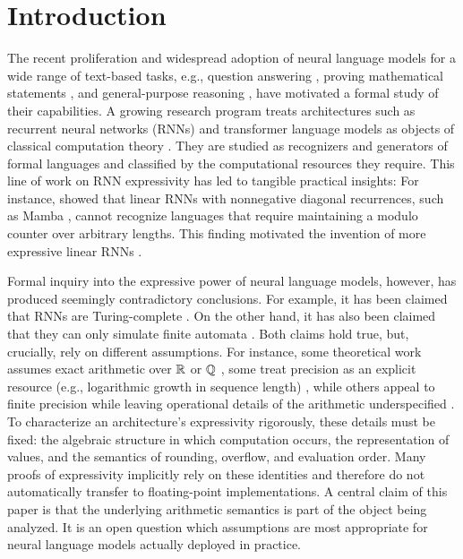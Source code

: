 \documentclass{article}
\begin{document}
\section{Introduction}
The recent proliferation and widespread adoption of neural language models for a wide range of text-based tasks, e.g., question answering \citep{chen2021evaluatinglargelanguagemodels}, proving mathematical statements \citep{lewkowycz2022solving}, and general-purpose reasoning \citep{wei2023chain, openai2024gpt4technicalreport}, have motivated a formal study of their capabilities. 
A growing research program treats architectures such as recurrent neural networks (RNNs) and transformer language models as objects of classical computation theory \citep[\textit{inter alia}]{Siegelmann1992OnTC, weiss-etal-2018-practical, merrill-2019-sequential, hahn-2020-theoretical, bhattamishra-etal-2020-ability, perez-etal-2021-attention, chiang-cholak-2022-overcoming, strobl-etal-2024-formal}. They are studied as recognizers and generators of formal languages and classified by the computational resources they require. 
This line of work on RNN expressivity has led to tangible practical insights: For instance, \citet{sarrof2024expressive} showed that linear RNNs with nonnegative diagonal recurrences, such as Mamba \citep{gu2024mamba}, cannot recognize languages that require maintaining a modulo counter over arbitrary lengths. This finding motivated the invention of more expressive linear RNNs \citep{grazzi2025unlocking}.

Formal inquiry into the expressive power of neural language models, however, has produced seemingly contradictory conclusions.
For example, it has been claimed that RNNs are Turing-complete \citep{Siegelmann1992OnTC}.
On the other hand, it has also been claimed that they can only simulate finite automata \citep{merrill-2019-sequential}. 
Both claims hold true, but, crucially, rely on different assumptions.
For instance, some theoretical work assumes exact arithmetic over $\mathbb{R}$ or $\mathbb{Q}$ \citep{Siegelmann1992OnTC, chen-etal-2018-recurrent, hahn-2020-theoretical, bhattamishra-etal-2020-ability, svete-etal-2024-lower}, some treat precision as an explicit resource (e.g., logarithmic growth in sequence length) \citep{merrill-sabharwal-2023-parallelism, karuvally2025bridging}, while others appeal to finite precision while leaving operational details of the arithmetic underspecified \citep{omlin1996constructing, weiss-etal-2018-practical, sarrof2024expressive, stogin2024provably}. 
To characterize an architecture’s expressivity rigorously, these details must be fixed: the algebraic structure in which computation occurs, the representation of values, and the semantics of rounding, overflow, and evaluation order. 
Many proofs of expressivity implicitly rely on these identities and therefore do not automatically transfer to floating-point implementations. 
A central claim of this paper is that the underlying arithmetic semantics is part of the object being analyzed. 
It is an open question which assumptions are most appropriate for neural language models actually deployed in practice.
\end{document}
